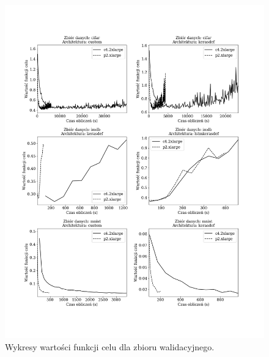 \documentclass[12pt,a4paper,twoside]{article}
\begin{document}
\begin{figure}[h]
  \centering
\includegraphics[scale=0.5]{../obrazy/fig:experiment_loss_val.png}
\caption{Wykresy wartości funkcji celu dla zbioru walidacyjnego.\label{fig:experiment_loss_val}}
\end{figure}
\end{document}
